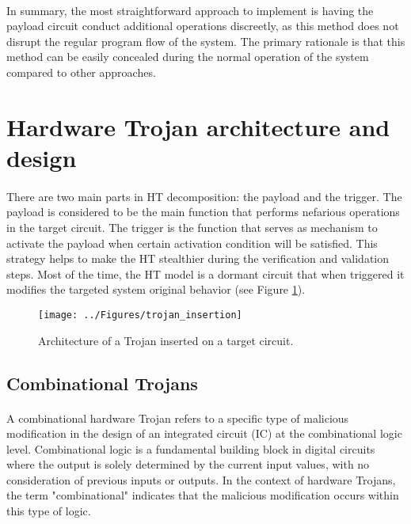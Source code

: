 \paragraph*{}
In summary, the most straightforward approach to implement is having the payload circuit conduct additional operations discreetly, as this method does not disrupt the regular program flow of the system. The primary rationale is that this method can be easily concealed during the normal operation of the system compared to other approaches.

\section{Hardware Trojan architecture and design}
\paragraph*{}
There are two main parts in HT decomposition: the payload and the trigger. The payload is considered to be the main function that performs nefarious operations in the target circuit. The trigger is the function that serves as mechanism to activate the payload when certain activation condition will be satisfied. This strategy helps to make the HT stealthier during the verification and validation steps. Most of the time, the HT model is a dormant circuit that when triggered it modifies the targeted system original behavior (see Figure \ref{fig:trojaninsertion}).

\begin{figure}[h]
	\centering
	\texttt{[image: ../Figures/trojan\_insertion]}
	\caption{Architecture of a Trojan inserted on a target circuit.}
	\label{fig:trojaninsertion}
\end{figure}
\pagebreak
\subsection{Combinational Trojans}
\paragraph*{}
A combinational hardware Trojan refers to a specific type of malicious modification in the design of an integrated circuit (IC) at the combinational logic level. Combinational logic is a fundamental building block in digital circuits where the output is solely determined by the current input values, with no consideration of previous inputs or outputs. In the context of hardware Trojans, the term "combinational" indicates that the malicious modification occurs within this type of logic.
